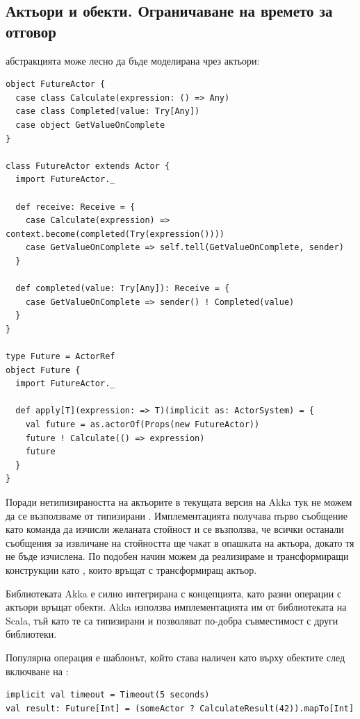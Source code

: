 \subsection{Актьори и  обекти. Ограничаване на времето за отговор}

 абстракцията може лесно да бъде моделирана чрез актьори:

\begin{lstlisting}
object FutureActor {
  case class Calculate(expression: () => Any)
  case class Completed(value: Try[Any])
  case object GetValueOnComplete
}

class FutureActor extends Actor {
  import FutureActor._
  
  def receive: Receive = {
    case Calculate(expression) => context.become(completed(Try(expression())))
    case GetValueOnComplete => self.tell(GetValueOnComplete, sender)
  }
  
  def completed(value: Try[Any]): Receive = {
    case GetValueOnComplete => sender() ! Completed(value)
  }
}

type Future = ActorRef
object Future {
  import FutureActor._
  
  def apply[T](expression: => T)(implicit as: ActorSystem) = {
    val future = as.actorOf(Props(new FutureActor))
    future ! Calculate(() => expression)
    future
  }
}
\end{lstlisting}

Поради нетипизираността на актьорите в текущата версия на Akka тук не можем да се възползваме от типизирани . Имплементацията получава първо съобщение като команда да изчисли желаната стойност и се възползва, че всички останали съобщения за извличане на стойността ще чакат в опашката на актьора, докато тя не бъде изчислена. По подобен начин можем да реализираме и трансформиращи конструкции като , които връщат  с трансформиращ актьор.

Библиотеката Akka е силно интегрирана с  концепцията, като разни операции с актьори връщат  обекти. Akka използва имплементацията им от библиотеката на Scala, тъй като те са типизирани и позволяват по-добра съвместимост с други библиотеки.

Популярна операция е  шаблонът, който става наличен като  върху  обектите след включване на :

\begin{lstlisting}
implicit val timeout = Timeout(5 seconds)
val result: Future[Int] = (someActor ? CalculateResult(42)).mapTo[Int]
\end{lstlisting}

